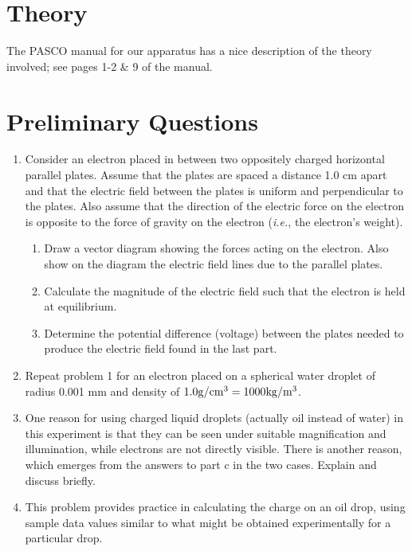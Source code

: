 
\section{Theory}

The PASCO manual for our apparatus has a nice description of the theory involved; see pages 1-2 \& 9 of the manual.

\section{Preliminary Questions}

\begin{enumerate}
\item Consider an electron placed in between two oppositely charged
horizontal parallel plates.  Assume that the plates are spaced a
distance 1.0 cm apart and that the electric field between the plates is
uniform and perpendicular to the plates.  Also assume that the
direction of the electric force on the electron is opposite to the
force of gravity on the electron ({\em i.e.}, the electron's
weight).
	\begin{enumerate}
	\item Draw a vector diagram showing the forces acting on the electron.  Also
show on the diagram the electric field lines due to the parallel plates.
	\item Calculate the magnitude of the electric field such that the electron is
held at equilibrium.
	\item Determine the potential difference (voltage) between the plates needed
to produce the electric field found in the last part.
	\end{enumerate}

\item Repeat problem 1 for an electron placed on a spherical
water droplet of radius 0.001 mm and density of $1.0 {\rm g}/{\rm cm}^3 = 1000 {\rm kg}/{\rm m}^3$.

\item One reason for using charged liquid droplets (actually oil instead of
water) in this experiment is 
that they can be seen under suitable magnification and illumination,
while electrons are not directly visible.  There is another reason,
which emerges from the answers to part c in the two cases. Explain and
discuss briefly.

\item This problem provides practice in calculating the charge on
an oil drop, using sample data values similar to what might be obtained
experimentally for a particular drop.
\end{enumerate}


